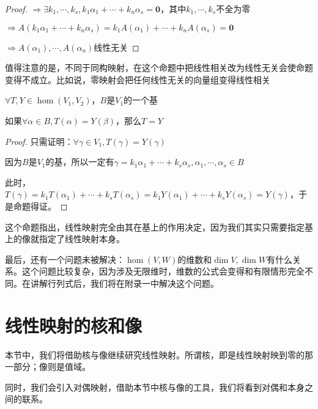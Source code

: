 \documentclass[12pt, a4paper, oneside, UTF8]{ctexbook}
\begin{document}
\begin{para}{0}
\begin{proof}
						$\Rightarrow \exists k_1,\cdots,k_s,k_1\alpha_1+\cdots+k_n\alpha_s=\mathbf{0}$，其中$k_1,\cdots,k_s$不全为零

						$\Rightarrow A(k_1\alpha_1+\cdots+k_n\alpha_s)=k_1A(\alpha_1)+\cdots+k_nA(\alpha_s)=\mathbf{0}$

						$\Rightarrow A(\alpha_1),\cdots,A(\alpha_n)$线性无关
					\end{proof}
					值得注意的是，不同于同构映射，在这个命题中把线性相关改为线性无关会使命题变得不成立。比如说，零映射会把任何线性无关的向量组变得线性相关
				\point{}
					\begin{proposition}
						$\forall T,Y \in \hom(V_1,V_2)$，$B$是$V_1$的一个基

						如果$\forall \alpha \in B,T(\alpha )=Y(\beta )$，那么$T=Y$
					\end{proposition}
					\begin{proof}
						只需证明：$\forall \gamma \in V_1,T(\gamma )=Y(\gamma )$

						因为$B$是$V_1$的基，所以一定有$\gamma =k_1 \alpha_1+\cdots+k_s \alpha_s,\alpha_1,\cdots,\alpha_s \in B$

						此时，$T(\gamma )=k_1 T(\alpha_1)+\cdots+ k_s T(\alpha_s)=k_1 Y(\alpha_1)+\cdots+ k_s Y(\alpha_s)=Y(\gamma )$，于是命题得证。
					\end{proof}
					这个命题指出，线性映射完全由其在基上的作用决定，因为我们其实只需要指定基上的像就指定了线性映射本身。
			\end{para}
			最后，还有一个问题未被解决：$\hom(V,W)$的维数和$\dim V,\dim W$有什么关系。这个问题比较复杂，因为涉及无限维时，维数的公式会变得和有限情形完全不同。在讲解行列式后，我们将在附录一中解决这个问题。
	\section{线性映射的核和像}
		本节中，我们将借助核与像继续研究线性映射。所谓核，即是线性映射映到零的那一部分；像则是值域。

		同时，我们会引入对偶映射，借助本节中核与像的工具，我们将看到对偶和本身之间的联系。
\end{document}
